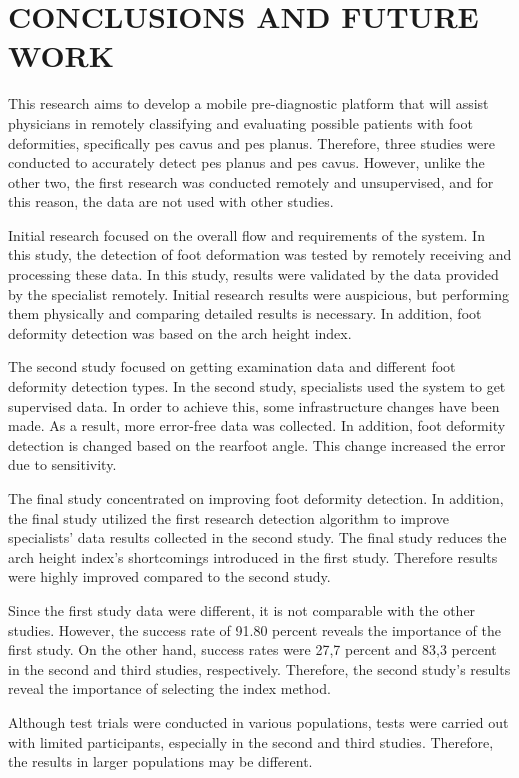 \chapter{CONCLUSIONS AND FUTURE WORK}\label{chp:ConclusionsAndFutureWork}

This research aims to develop a mobile pre-diagnostic platform that will assist physicians in remotely classifying and evaluating possible patients with foot deformities, specifically pes cavus and pes planus. Therefore, three studies were conducted to accurately detect pes planus and pes cavus. However, unlike the other two, the first research was conducted remotely and unsupervised, and for this reason, the data are not used with other studies.

Initial research focused on the overall flow and requirements of the system. In this study, the detection of foot deformation was tested by remotely receiving and processing these data. In this study, results were validated by the data provided by the specialist remotely. Initial research results were auspicious, but performing them physically and comparing detailed results is necessary. In addition, foot deformity detection was based on the arch height index. 

The second study focused on getting examination data and different foot deformity detection types. In the second study, specialists used the system to get supervised data. In order to achieve this, some infrastructure changes have been made. As a result, more error-free data was collected. In addition, foot deformity detection is changed based on the rearfoot angle. This change increased the error due to sensitivity.

The final study concentrated on improving foot deformity detection. In addition, the final study utilized the first research detection algorithm to improve specialists' data results collected in the second study. The final study reduces the arch height index's shortcomings introduced in the first study. Therefore results were highly improved compared to the second study. 

Since the first study data were different, it is not comparable with the other studies. However, the success rate of 91.80 percent reveals the importance of the first study. On the other hand, success rates were 27,7 percent and 83,3 percent in the second and third studies, respectively. Therefore, the second study's results reveal the importance of selecting the index method.

Although test trials were conducted in various populations, tests were carried out with limited participants, especially in the second and third studies. 
Therefore, the results in larger populations may be different.


